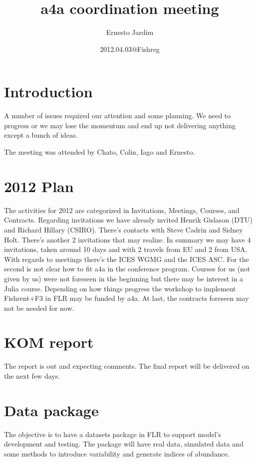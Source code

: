 \documentclass[10pt,a4paper]{article}
\begin{document}
\title{a4a coordination meeting}
\date{2012.04.03@Fishreg}
\author{Ernesto Jardim}
\maketitle
\section{Introduction}
A number of issues required our attention and some planning. We need to progress or we may lose the momentum and end up not delivering anything except a bunch of ideas.

The meeting was attended by Chato, Colin, Iago and Ernesto.

\section{2012 Plan}
The activities for 2012 are categorized in Invitations, Meetings, Courses, and Contracts. Regarding invitations we have already invited Henrik Gislason (DTU) and Richard Hillary (CSIRO). There's contacts with Steve Cadrin and Sidney Holt. There's another 2 invitations that may realize. In summary we may have 4 invitations, taken around 10 days and with 2 travels from EU and 2 from USA. With regards to meetings there's the ICES WGMG and the ICES ASC. For the second is not clear how to fit a4a in the conference program. Courses for us (not given by us) were not foreseen in the beginning but there may be interest in a Julia course. Depending on how things progress the workshop to implement Fishrent+F3 in FLR may be funded by a4a. At last, the contracts foreseen may not be needed for now. 

\section{KOM report}
The report is out and expecting comments. The final report will be delivered on the next few days.

\section{Data package}
The objective is to have a datasets package in FLR to support model's development and testing. The package will have real data, simulated data and some methods to introduce variability and generate indices of abundance.
\end{document}
